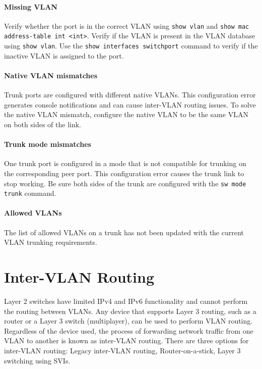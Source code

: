\paragraph{Missing VLAN} Verify whether the port is in the correct VLAN using \verb|show vlan| and \verb|show mac address-table int <int>|. Verify if the VLAN is present in the VLAN database using \verb|show vlan|. Use the \verb|show interfaces switchport| command to verify if the inactive VLAN is assigned to the port.


\paragraph{Native VLAN mismatches} Trunk ports are configured with different native VLANs. This configuration error generates console notifications and can cause inter-VLAN routing issues. To solve the native VLAN mismatch, configure the native VLAN to be the same VLAN on both sides of the link.

\paragraph{Trunk mode mismatches} One trunk port is configured in a mode that is not compatible for trunking on the corresponding peer port. This configuration error causes the trunk link to stop working. Be sure both sides of the trunk are configured with the \verb|sw mode trunk| command. 

\paragraph{Allowed VLANs} The list of allowed VLANs on a trunk has not been updated with the current VLAN trunking requirements. 

\section{Inter-VLAN Routing}

Layer 2 switches have limited IPv4 and IPv6 functionality and cannot perform the routing between VLANs. Any device that supports Layer 3 routing, such as a router or a Layer 3 switch (multiplayer), can be used to perform VLAN routing. Regardless of the device used, the process of forwarding network traffic from one VLAN to another is known as inter-VLAN routing. There are three options for inter-VLAN routing: Legacy inter-VLAN routing, Router-on-a-stick, Layer 3 switching using SVIs.

